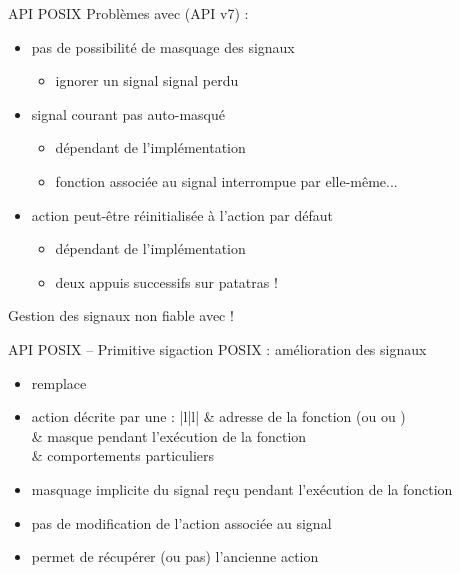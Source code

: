\begin {frame} {API POSIX}
    Problèmes avec  (API v7) :

    \begin {itemize}
	\item pas de possibilité de masquage des signaux
	    \begin {itemize}
		\item ignorer un signal \implique signal perdu
	    \end {itemize}
	\item signal courant pas auto-masqué
	    \begin {itemize}
		\item dépendant de l'implémentation
		\item fonction associée au signal interrompue par
		    elle-même...
	    \end {itemize}
	\item action peut-être réinitialisée à l'action par défaut
	    \begin {itemize}
		\item dépendant de l'implémentation
		\item deux appuis successifs sur 
		    \implique patatras !
	    \end {itemize}
    \end {itemize}

    \vspace* {3mm}

    Gestion des signaux non fiable avec  !
\end {frame}

\begin {frame} {API POSIX -- Primitive sigaction}
    POSIX : amélioration des signaux


    \begin {itemize}
	\item {} remplace 
	\item action décrite par une  :
	    \ctableau {\fC} {|l|l|} {
		    & adresse de la fonction (ou  ou
			)
		    \\
		    & masque pendant l'exécution de la fonction
		    \\
		    & comportements particuliers
		    \\
	    }

	    \vspace* {1mm}

	\item masquage implicite du signal reçu pendant l'exécution
	    de la fonction
	\item pas de modification de l'action associée au signal
	\item permet de récupérer (ou pas) l'ancienne action
    \end {itemize}
\end {frame}

